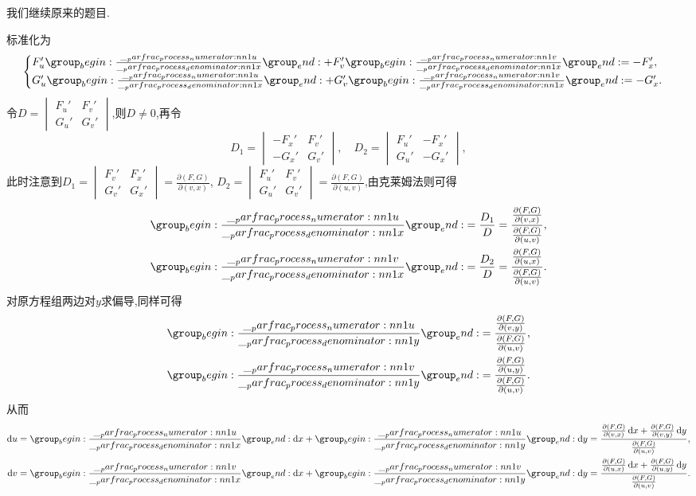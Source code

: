 \begin{solution}
\begin{remark}
        我们继续原来的题目.
    \end{remark}
    标准化为
    $$
    \begin{cases}
        F_u' \parfrac{u}{x} + F_v' \parfrac{v}{x} = -F_x',\\
        G_u' \parfrac{u}{x} + G_v' \parfrac{v}{x} = -G_x'.
    \end{cases}
    $$
    令$D = \begin{vmatrix}
        F_u' & F_v'\\
        G_u' & G_v'
    \end{vmatrix}$,则$D \neq 0$,再令
    $$
    D_1 = \begin{vmatrix}
        -F_x' & F_v'\\
        -G_x' & G_v'
    \end{vmatrix}, \quad D_2 = \begin{vmatrix}
        F_u' & -F_x'\\
        G_u' & -G_x'
    \end{vmatrix},
    $$
    此时注意到$D_1 = \begin{vmatrix}
        F_v' & F_x'\\
        G_v' & G_x'
    \end{vmatrix} = \frac{\partial (F,G)}{\partial (v,x)}$, $D_2 = \begin{vmatrix}
        F_u' & F_v'\\
        G_u' & G_v'
    \end{vmatrix} = \frac{\partial (F,G)}{\partial (u,v)}$,由克莱姆法则可得
    \begin{align*}
        \parfrac{u}{x} &= \frac{D_1}{D} = \frac{\frac{\partial (F,G)}{\partial (v,x)}}{\frac{\partial (F,G)}{\partial (u,v)}},\\
        \parfrac{v}{x} &= \frac{D_2}{D} = \frac{\frac{\partial (F,G)}{\partial (u,x)}}{\frac{\partial (F,G)}{\partial (u,v)}}.
    \end{align*}
    对原方程组两边对$y$求偏导,同样可得
    \begin{align*}
        \parfrac{u}{y} &= \frac{\frac{\partial (F,G)}{\partial (v,y)}}{\frac{\partial (F,G)}{\partial (u,v)}},\\
        \parfrac{v}{y} &= \frac{\frac{\partial (F,G)}{\partial (u,y)}}{\frac{\partial (F,G)}{\partial (u,v)}}.
    \end{align*}
    从而
    \begin{align*}
        \dif u = \parfrac{u}{x} \dif x + \parfrac{u}{y} \dif y = \frac{\frac{\partial (F,G)}{\partial (v,x)}\dif x + \frac{\partial (F,G)}{\partial (v,y)} \dif y}{\frac{\partial (F,G)}{\partial (u,v)}},\\
        \dif v = \parfrac{v}{x} \dif x + \parfrac{v}{y} \dif y = \frac{\frac{\partial (F,G)}{\partial (u,x)}\dif x + \frac{\partial (F,G)}{\partial (u,y)} \dif y}{\frac{\partial (F,G)}{\partial (u,v)}}.
    \end{align*}
\end{solution}

